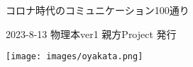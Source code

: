 \clearpage{\thispagestyle{empty}}
\vspace{220pt}

\begin{center}


\begin{sffamily}
\Large
コロナ時代のコミュニケーション100通り
\normalsize
\end{sffamily}
\vspace{320pt}

\begin{sffamily}
2023-8-13
\hspace{5pt}
物理本ver1
\hspace{5pt}
親方Project
\hspace{5pt}
発行
\vspace{10pt}
\end{sffamily}

\texttt{[image: images/oyakata.png]}

\end{center}
